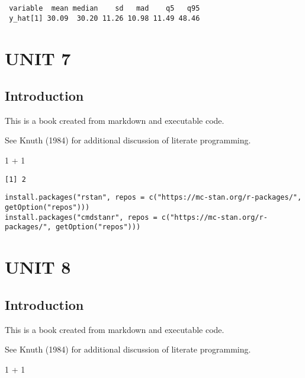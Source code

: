 \documentclass[
  letterpaper,
  DIV=11,
  numbers=noendperiod]{scrreprt}
\newenvironment{Shaded}{\begin{snugshade}}{\end{snugshade}}
\newcommand{\DecValTok}[1]{\textcolor[rgb]{0.68,0.00,0.00}{#1}}
\newcommand{\SpecialCharTok}[1]{\textcolor[rgb]{0.37,0.37,0.37}{#1}}
\begin{document}
\begin{verbatim}
 variable  mean median    sd   mad    q5   q95
 y_hat[1] 30.09  30.20 11.26 10.98 11.49 48.46
\end{verbatim}

\part{UNIT 7}

\hypertarget{introduction-4}{%
\chapter{Introduction}\label{introduction-4}}

This is a book created from markdown and executable code.

See Knuth (1984) for additional discussion of literate programming.

\begin{Shaded}
\begin{Highlighting}[]
\DecValTok{1} \SpecialCharTok{+} \DecValTok{1}
\end{Highlighting}
\end{Shaded}

\begin{verbatim}
[1] 2
\end{verbatim}

\begin{verbatim}
install.packages("rstan", repos = c("https://mc-stan.org/r-packages/", getOption("repos")))
install.packages("cmdstanr", repos = c("https://mc-stan.org/r-packages/", getOption("repos")))
\end{verbatim}

\part{UNIT 8}

\hypertarget{introduction-5}{%
\chapter{Introduction}\label{introduction-5}}

This is a book created from markdown and executable code.

See Knuth (1984) for additional discussion of literate programming.

\begin{Shaded}
\begin{Highlighting}[]
\DecValTok{1} \SpecialCharTok{+} \DecValTok{1}
\end{Highlighting}
\end{Shaded}
\end{document}
